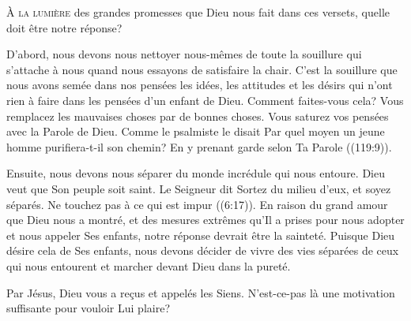 


\lettrine{À}{ la lumière} des grandes promesses que Dieu nous fait
 dans ces versets, quelle doit être notre réponse? 

D'abord, nous devons nous nettoyer nous-mêmes de toute la souillure
 qui s'attache à nous quand nous essayons de satisfaire la chair.
 C'est la souillure que nous avons semée dans nos pensées
 \ocadr les idées, les attitudes et les désirs qui n'ont rien à faire
 dans les pensées d'un enfant de Dieu. Comment faites-vous cela?
 Vous remplacez les mauvaises choses par de bonnes choses.
 Vous saturez vos pensées avec la Parole de Dieu.
 Comme le psalmiste le disait\frcolon{} 
 \Og Par quel moyen un jeune homme purifiera-t-il son chemin?
 En y prenant garde selon Ta Parole \Fg{} ((119:9)).


Ensuite, nous devons nous séparer du monde incrédule qui nous entoure.
 Dieu veut que Son peuple soit saint. Le Seigneur dit\frcolon{} 
 \Og Sortez du milieu d’eux, et soyez séparés.
 Ne touchez pas à ce qui est impur \Fg{} ((6:17)).
 En raison du grand amour que Dieu nous a montré,
 et des mesures extrêmes qu'Il a prises pour nous adopter
 et nous appeler Ses enfants, notre réponse devrait être la sainteté.
 Puisque Dieu désire cela de Ses enfants, nous devons décider de vivre
 des vies séparées de ceux qui nous entourent et marcher devant Dieu dans la pureté.

Par Jésus, Dieu vous a re\c{c}us et appelés les Siens.
 N'est-ce-pas là une motivation suffisante pour vouloir Lui plaire?

\dvrule




